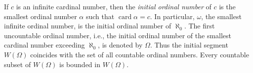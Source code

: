If $c$ is an infinite cardinal number, then the \textit{initial ordinal number} of $c$ is the smallest ordinal number $\alpha$ such that $\operatorname{card} \alpha = c$. In particular, $\omega$, the smallest infinite ordinal number, is the initial ordinal number of $\aleph_0$. The first uncountable ordinal number, i.e., the initial ordinal number of the smallest cardinal number exceeding $\aleph_0$, is denoted by $\Omega$. Thus the initial segment $W(\Omega)$ coincides with the set of all countable ordinal numbers. Every countable subset of $W(\Omega)$ is bounded in $W(\Omega)$.
